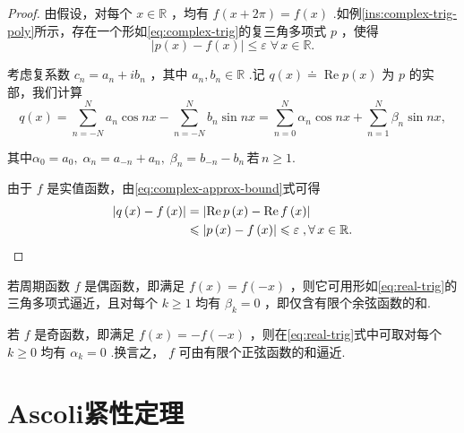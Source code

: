 \begin{proof}
由假设，对每个 $x \in  \mathbb{R}$ ，均有 $f\left( {x + {2\pi }}\right)  = f\left( x\right)$ .如例\ref{ins:complex-trig-poly}所示，存在一个形如\eqref{eq:complex-trig}的复三角多项式 $p$ ，使得
\begin{equation}\tag{3.8}\label{eq:complex-approx-bound}
\left| {p\left( x\right)  - f\left( x\right) }\right|  \leq  \varepsilon \;\forall\,x \in  \mathbb{R}.
\end{equation}

考虑复系数 ${c}_{n} = {a}_{n} + i{b}_{n}$ ，其中 ${a}_{n},{b}_{n} \in  \mathbb{R}$ .记 $q\left( x\right)  \doteq  \operatorname{Re}p\left( x\right)$ 为 $p$ 的实部，我们计算
\[
q\left( x\right)  = \mathop{\sum }\limits_{{n =  - N}}^{N}{a}_{n}\cos {nx} - \mathop{\sum }\limits_{{n =  - N}}^{N}{b}_{n}\sin {nx} = \mathop{\sum }\limits_{{n = 0}}^{N}{\alpha }_{n}\cos {nx} + \mathop{\sum }\limits_{{n = 1}}^{N}{\beta }_{n}\sin {nx},
\]

其中${\alpha }_{0} = {a}_{0},\;{\alpha }_{n} = {a}_{-n} + {a}_{n},\;{\beta }_{n} = {b}_{-n} - {b}_{n}\,\text{若}\,n \geq  1.$

由于 $f$ 是实值函数，由\eqref{eq:complex-approx-bound}式可得
{\setjot[-2]\begin{align*}
\left| {q\left( x\right)  - f\left( x\right) }\right|  &= \left| {\operatorname{Re}p\left( x\right)  - \operatorname{Re}f\left( x\right) }\right| \\
&\leq  \left| {p\left( x\right)  - f\left( x\right) }\right|  \leq  \varepsilon \;,\forall\,x \in  \mathbb{R}.\qedhere
\end{align*}}
\end{proof}

\begin{remark}\label{rem:even-odd-trig}
若周期函数 $f$ 是偶函数，即满足 $f\left( x\right)  = f\left( {-x}\right)$ ，则它可用形如\eqref{eq:real-trig}的三角多项式逼近，且对每个 $k \geq  1$ 均有 ${\beta }_{k} = 0$ ，即仅含有限个余弦函数的和.

若 $f$ 是奇函数，即满足 $f\left( x\right)  =  - f\left( {-x}\right)$ ，则在\eqref{eq:real-trig}式中可取对每个 $k \geq  0$ 均有 ${\alpha }_{k} = 0$ .换言之， $f$ 可由有限个正弦函数的和逼近.
\end{remark}

\section{Ascoli紧性定理}

